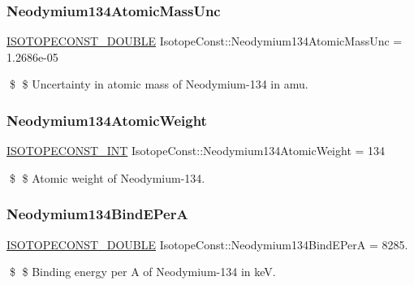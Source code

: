 \subsubsection{\texorpdfstring{Neodymium134\+Atomic\+Mass\+Unc}{Neodymium134AtomicMassUnc}}
{\footnotesize\ttfamily \mbox{\hyperlink{group___isotope_const-_macros_ga8f45a7272ce02c0b4c65c44636ed719a}{I\+S\+O\+T\+O\+P\+E\+C\+O\+N\+S\+T\+\_\+\+D\+O\+U\+B\+LE}} Isotope\+Const\+::\+Neodymium134\+Atomic\+Mass\+Unc = 1.\+2686e-\/05}

\$ \$ Uncertainty in atomic mass of Neodymium-\/134 in amu. \mbox{\label{group___isotope_const-_neodymium-_nd134_ga81c4486fca81d7003846e3708d4846aa}} 
\subsubsection{\texorpdfstring{Neodymium134\+Atomic\+Weight}{Neodymium134AtomicWeight}}
{\footnotesize\ttfamily \mbox{\hyperlink{group___isotope_const-_macros_ga5f18360b3e99483a35c32d789e62621c}{I\+S\+O\+T\+O\+P\+E\+C\+O\+N\+S\+T\+\_\+\+I\+NT}} Isotope\+Const\+::\+Neodymium134\+Atomic\+Weight = 134}

\$ \$ Atomic weight of Neodymium-\/134. \mbox{\label{group___isotope_const-_neodymium-_nd134_gaa7e023eac3d228e7051a57a777e9f6a7}} 
\subsubsection{\texorpdfstring{Neodymium134\+Bind\+E\+PerA}{Neodymium134BindEPerA}}
{\footnotesize\ttfamily \mbox{\hyperlink{group___isotope_const-_macros_ga8f45a7272ce02c0b4c65c44636ed719a}{I\+S\+O\+T\+O\+P\+E\+C\+O\+N\+S\+T\+\_\+\+D\+O\+U\+B\+LE}} Isotope\+Const\+::\+Neodymium134\+Bind\+E\+PerA = 8285.}

\$ \$ Binding energy per A of Neodymium-\/134 in keV. \mbox{\label{group___isotope_const-_neodymium-_nd134_gadbe3595c2d70da0d1965c8843a21c58a}} 
